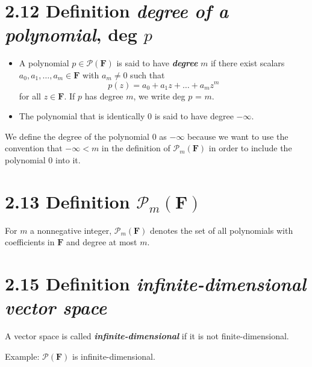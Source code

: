 \documentclass[12pt, letterpaper, oneside]{book}
\begin{document}
\section{2.12 Definition \textbf{\textit{degree of a polynomial}}, deg $p$}

\begin{itemize}
  \item A polynomial $p \in \mathcal{P}(\mathbf{F})$ is said to have \textbf{
    \textit{degree}} $m$ if there exist scalars $a_0, a_1, \ldots, a_m \in
    \mathbf{F}$ with $a_m \neq 0$ such that
    \[
      p(z) = a_0 + a_{1}z + \dots + a_{m}z^m
    \]
    for all $z \in \mathbf{F}$. If $p$ has degree $m$, we write deg $p$ = $m$.
  \item The polynomial that is identically 0 is said to have degree $-\infty$.
\end{itemize}

We define the degree of the polynomial $0$ as $-\infty$ because we want to use
the convention that $-\infty < m$ in the definition of $\mathcal{P}_m(\mathbf{
F})$ in order to include the polynomial $0$ into it.

\section{2.13 Definition $\mathcal{P}_m(\mathbf{F})$}

For $m$ a nonnegative integer, $\mathcal{P}_m(\mathbf{F})$ denotes the set of
all polynomials with coefficients in $\mathbf{F}$ and degree at most $m$.

\section{2.15 Definition \textbf{\textit{infinite-dimensional vector space}}}

A vector space is called \textbf{\textit{infinite-dimensional}} if it is not
finite-dimensional.

Example: $\mathcal{P}(\mathbf{F})$ is infinite-dimensional.
\end{document}
